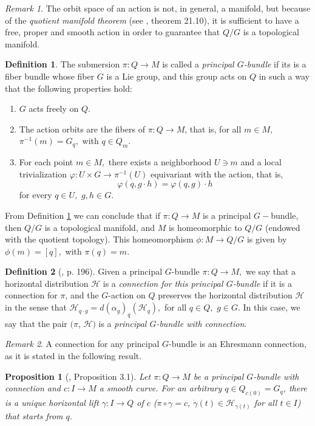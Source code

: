 \documentclass[12pt, letterpaper, reqno]{amsart}
\theoremstyle{definition}
\newtheorem{df}{Definition}
\theoremstyle{plain}
\newtheorem{prop}{Proposition}
\theoremstyle{remark}
\newtheorem{rem}{Remark}
\begin{document}
\begin{rem}
The orbit space of an action is not, in general, a manifold, but because of the \textit{quotient manifold theorem} (see \cite{lee2003introduction}, theorem 21.10), it is sufficient to have a free, proper and smooth action in order to guarantee that $ Q/G $ is a topological manifold.
\end{rem}
\begin{df}\label{df:principalGbundle}
	The submersion $ \pi: Q \rightarrow M$  is called a \textit{principal $ G $-bundle} if its is a fiber bundle whose fiber $ G $ is a Lie group, and this group acts on $ Q $ in such a way that the following properties hold:
	\begin{enumerate}
		\item $ G $ acts freely on $ Q $.
		\item The action orbits are the fibers of $ \pi:Q \rightarrow {M} $, that is, for all $ m\in M, $ $ \pi^{-1}(m) = G_q, $ with $ q\in Q_m. $ 
		\item For each point $ m\in M, $ there exists a neighborhood $ U\ni m $ and a local trivialization $ \varphi: U\times G \rightarrow \pi^{-1}(U)$ equivariant with the action, that is,
			$$ \varphi(q, g\cdot h)=\varphi(q,g)\cdot h  $$ 
			for every $ q\in U, $ $ g,h\in G. $ 
	\end{enumerate}
\end{df}

From Definition \ref{df:principalGbundle} we can conclude that if $ \pi: Q \rightarrow M $ is a principal $ G- $bundle, then $Q/G  $ is a topological manifold, and $M $ is homeomorphic to $ Q/G $ (endowed with the quotient topology). This homeomorphism $ \phi: M \rightarrow {Q/G}$  is given by $ \phi(m)=[q], $ with $ \pi(q)=m. $ 

\begin{df}[\cite{montgomery2002tour}, p. 196]
	Given a principal $ G $-bundle $ \pi: Q \rightarrow M, $ we say that a horizontal distribution $ \mathcal{H} $ is a \textit{connection for this principal $ G $-bundle} if it is a connection for $ \pi $, and the $ G $-action on $ Q $ preserves the horizontal distribution $ \mathcal{H} $ in the sense that $ \mathcal{H}_{q\cdot g} = d(\alpha_g)_q (\mathcal{H}_q), $ for all $ q\in Q, $ $ g\in G $. In this case, we say that the pair $ (\pi$, $ \mathcal{H}) $ is a \textit{principal $ G $-bundle with connection}. 

\end{df}

\begin{rem}
A connection for any principal $ G $-bundle is an Ehresmann connection, as it is stated in the following result. 
\end{rem}
\begin{prop}[\cite{kobayashi1963foundations}, Proposition 3.1]\label{prop:comp_bundle}
	Let $ \pi: Q \rightarrow M $ be a principal $ G $-bundle with connection and $ c: I \rightarrow M $ a smooth curve. For an arbitrary $ q\in Q_{c(0)}= G_q $, there is a unique horizontal lift $ \gamma: I \rightarrow Q $ of $ c $ ($\pi\circ\gamma =c$, $ \dot{\gamma}(t)\in \mathcal{H}_{\gamma(t)} $ for all $ t\in I $) that starts from $ q $.    	
\end{prop}
\end{document}
